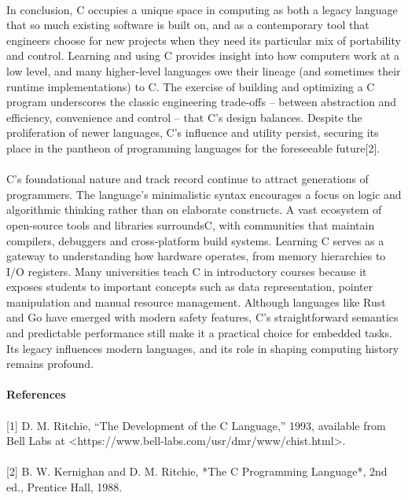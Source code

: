 \documentclass{article}
\begin{document}
\\
{\normalsize In conclusion, C occupies a unique space in computing as both a legacy }{\normalsize language that so much existing software is built on, and as a contemporary tool that engineers choose for new projects when they need its particular mix of portability and control. Learning and using C provides insight into how computers work at a low leve}{\normalsize l, and many higher-level languages owe their lineage (and sometimes their runtime implementations) to C. The exercise of building and optimizing a C program underscores the classic engineering trade-offs – between abstraction and efficiency, convenience an}{\normalsize d control – that C’s design balances. Despite the proliferation of newer languages, C’s influence and utility persist, securing its place in the pantheon of programming languages for the foreseeable }{\normalsize future[}{\normalsize 2].}\\
\\
{\normalsize C’s foundational nature and track record cont}{\normalsize inue to attract generations of programmers. The language’s minimalistic syntax encourages a focus on logic and algorithmic thinking rather than on elaborate constructs. A vast ecosystem of open}{\normalsize -source tools and libraries }{\normalsize surrounds}{\normalsize  C, with communities that }{\normalsize maintain compilers, debuggers and cross}{\normalsize -platform build systems. Learning C serves as a gateway to understanding how hardware operates, from memory hierarchies to I/O registers. Many universities teach C in introductory courses because it exposes students t}{\normalsize o important concepts such as data representation, pointer manipulation and manual resource management. Although languages like Rust and Go have emerged with modern safety features, C’s straightforward semantics and predictable performance still make it a p}{\normalsize ractical choice for embedded tasks. Its legacy influences modern languages, and its role in shaping computing history remains profound.}\\
\\
{\Large \textbf{References}}\\
\\
{\normalsize [1] D. M. Ritchie, “The Development of the C Language,” 1993, available from Bell Labs at <https://www.bell}{\normalsize -labs.com/usr/dmr/www/chist.html>.}\\
\\
{\normalsize [2] B. W. Kernighan and D. M. Ritchie, *The C Programming Language*, 2nd ed., Prentice Hall, 1988.}\\
\end{document}
